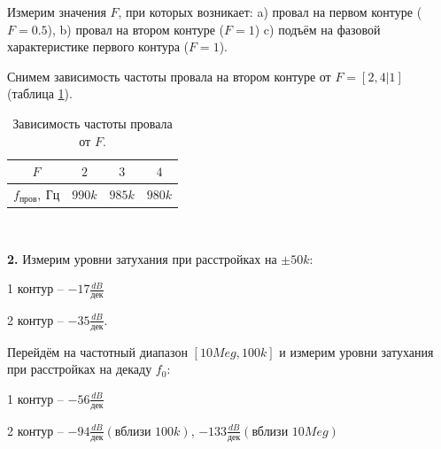 \documentclass[a4paper, 12pt, twoside]{article}
\begin{document}
Измерим значения $F$, при которых возникает: a) провал на первом контуре ($F = 0.5$), b) провал на втором контуре ($F = 1$) c) подъём на фазовой характеристике первого контура ($F = 1$).

Снимем зависимость частоты провала на втором контуре от $F = [2, 4|1]$ (таблица \ref{t3}).

\begin{table}[H]
	\centering
	\caption{Зависимость частоты провала от $F$. }
	\label{t3}
	\begin{tabular}{c|ccc} \toprule
		$F$               & $2$    & $3$    & $4$    \\ \midrule
		$f_{\text{пров}},~\text{Гц}$ & $990k$ & $985k$ & $980k$ \\ \bottomrule
	\end{tabular}
\end{table}

~

\textbf{2.} Измерим уровни затухания при расстройках на $\pm 50k$:

1 контур -- $-17 \frac{dB}{\text{дек}}$

2 контур -- $-35 \frac{dB}{\text{дек}}$.

Перейдём на частотный диапазон $[10Meg,100k]$ и измерим уровни затухания при расстройках на декаду $f_0$:

1 контур -- $-56\frac{dB}{\text{дек}}$

2 контур -- $-94\frac{dB}{\text{дек}}(\text{вблизи $100k$})$, $-133\frac{dB}{\text{дек}}(\text{вблизи $10Meg$})$
\end{document}
